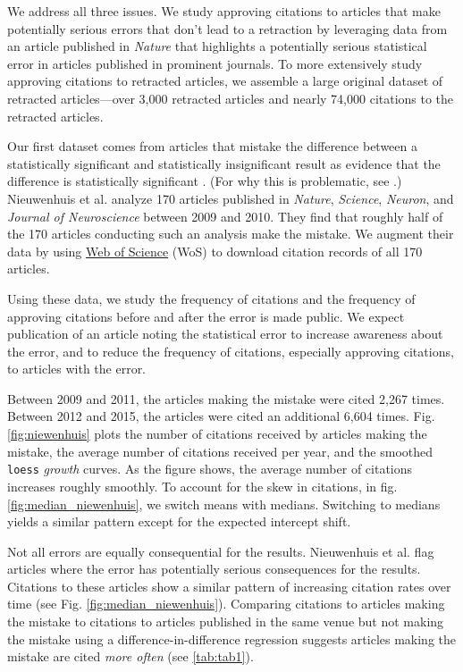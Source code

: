 \documentclass[12pt]{article}
\begin{document}
We address all three issues.  We study approving citations to articles that make potentially serious errors that don't lead to a retraction by leveraging data from an article published in \textit{Nature} that highlights a potentially serious statistical error in articles published in prominent journals. To more extensively study approving citations to retracted articles, we assemble a large original dataset of retracted articles---over 3,000 retracted articles and nearly 74,000 citations to the retracted articles.

Our first dataset comes from articles that mistake the difference between a statistically significant and statistically insignificant result as evidence that the difference is statistically significant \cite{nieuwenhuis2011}. (For why this is problematic, see \cite{gelman2006}.) Nieuwenhuis et al. \cite{nieuwenhuis2011} analyze 170 articles published in \textit{Nature}, \textit{Science}, \textit{Neuron}, and \textit{Journal of Neuroscience} between 2009 and 2010. They find that roughly half of the 170 articles conducting such an analysis make the mistake. We augment their data by using \href{https://webofknowledge.com}{Web of Science} (WoS) \cite{reuters2012web} to download citation records of all 170 articles.

Using these data, we study the frequency of citations and the frequency of approving citations before and after the error is made public. We expect publication of an article noting the statistical error to increase awareness about the error, and to reduce the frequency of citations, especially approving citations, to articles with the error.

Between 2009 and 2011, the articles making the mistake were cited 2,267 times. Between 2012 and 2015, the articles were cited an additional 6,604 times. Fig. \ref{fig:niewenhuis} plots the number of citations received by articles making the mistake, the average number of citations received per year, and the smoothed \texttt{loess} \textit{growth} curves. As the figure shows, the average number of citations increases roughly smoothly. To account for the skew in citations, in fig. \ref{fig:median_niewenhuis}, we switch means with medians. Switching to medians yields a similar pattern except for the expected intercept shift.

Not all errors are equally consequential for the results. Nieuwenhuis et al. flag articles where the error has potentially serious consequences for the results. Citations to these articles show a similar pattern of increasing citation rates over time (see Fig. \ref{fig:median_niewenhuis}). Comparing citations to articles making the mistake to citations to articles published in the same venue but not making the mistake using a difference-in-difference regression suggests articles making the mistake are cited \textit{more often}  (see \ref{tab:tab1}).
\end{document}

